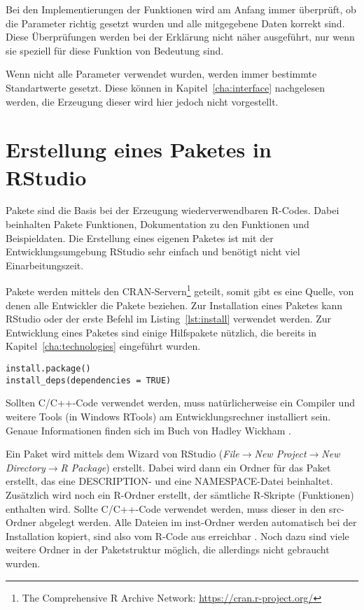 Bei den Implementierungen der Funktionen wird am Anfang immer überprüft, ob die Parameter richtig gesetzt wurden und alle mitgegebene Daten korrekt sind. Diese Überprüfungen werden bei der Erklärung nicht näher ausgeführt, nur wenn sie speziell für diese Funktion von Bedeutung sind. 

Wenn nicht alle Parameter verwendet wurden, werden immer bestimmte Standartwerte gesetzt. Diese können in Kapitel~\ref{cha:interface} nachgelesen werden, die Erzeugung dieser wird hier jedoch nicht vorgestellt.



\section{Erstellung eines Paketes in RStudio}
\label{sec:implementation_package}
Pakete sind die Basis bei der Erzeugung wiederverwendbaren R-Codes. Dabei beinhalten Pakete Funktionen, Dokumentation zu den Funktionen und Beispieldaten. Die Erstellung eines eigenen Paketes ist mit der Entwicklungsumgebung RStudio sehr einfach und benötigt nicht viel Einarbeitungszeit.

Pakete werden mittels den CRAN-Servern\footnote{The Comprehensive R Archive Network: \url{https://cran.r-project.org/}} geteilt, somit gibt es eine Quelle, von denen alle Entwickler die Pakete beziehen. Zur Installation eines Paketes kann RStudio oder der erste Befehl im Listing~\ref{lst:install} verwendet werden. Zur Entwicklung eines Paketes sind einige Hilfspakete nützlich, die bereits in Kapitel~\ref{cha:technologies} eingeführt wurden. 

\begin{lstlisting}[caption=Installation eines Paketes und dessen Abhängigkeiten, label={lst:install}, float=!th]
install.package()
install_deps(dependencies = TRUE)
\end{lstlisting}

Sollten C/C++-Code verwendet werden, muss natürlicherweise ein Compiler und weitere Tools (in Windows RTools) am Entwicklungsrechner installiert sein. Genaue Informationen finden sich im Buch von Hadley Wickham \cite[18 ff.]{wickham2015r}.

Ein Paket wird mittels dem Wizard von RStudio (\emph{File$\rightarrow$New Project$\rightarrow$New Directory$\rightarrow$R Package}) erstellt. Dabei wird dann ein Ordner für das Paket erstellt, das eine DESCRIPTION- und eine NAMESPACE-Datei beinhaltet. Zusätzlich wird noch ein R-Ordner erstellt, der sämtliche R-Skripte (Funktionen) enthalten wird. Sollte C/C++-Code verwendet werden, muss dieser in den src-Ordner abgelegt werden. Alle Dateien im inst-Ordner werden automatisch bei der Installation kopiert, sind also vom R-Code aus erreichbar \cite[196 ff.]{wickham2015r}. Noch dazu sind viele weitere Ordner in der Paketstruktur möglich, die allerdings nicht gebraucht wurden. \cite[28 ff.]{wickham2015r}

